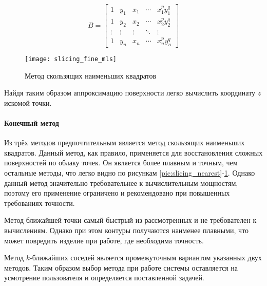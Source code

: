          \begin{equation}
             B = 
             \begin{bmatrix}
                 1 & y_1 & x_1 & \cdots & x_1^p y_1^q\\
                 1 & y_2 & x_2 & \cdots & x_2^p y_2^q\\
                 \vdots & \vdots & \vdots & \ddots & \vdots\\
                 1 & y_n & x_n & \cdots & x_n^p y_n^q
             \end{bmatrix}
         \end{equation}
         
         \begin{figure}[H]
             \centering
             \texttt{[image: slicing\_fine\_mls]}
             \caption{Метод скользящих наименьших квадратов}
             \label{pic:slicing_mls}
         \end{figure}
         
         Найдя таким образом аппроксимацию поверхности легко вычислить координату $ z $ искомой точки.
        
        \paragraph{Конечный метод}
            Из трёх методов предпочтительным является метод скользящих наименьших квадратов. Данный метод, как правило, применяется для восстановления сложных поверхностей по облаку точек. Он является более плавным и точным, чем остальные методы, что легко видно по рисункам \ref{pic:slicing_nearest}-\ref{pic:slicing_mls}. Однако данный метод значительно требовательнее к вычислительным мощностям, поэтому его применение ограничено и рекомендовано при повышенных требованиях точности. 
            
            Метод ближайшей точки самый быстрый из рассмотренных и не требователен к вычислениям. Однако при этом контуры получаются наименее плавными, что может повредить изделие при работе, где необходима точность.
            
            Метод $ k $-ближайших соседей является промежуточным вариантом указанных двух методов. Таким образом выбор метода при работе системы оставляется на усмотрение пользователя и определяется поставленной задачей.